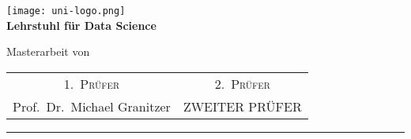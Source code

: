 \begin{titlepage}
    \centering
    \begin{onehalfspace}
    	
        	\texttt{[image: uni-logo.png]}\\
        	\vspace{1.0cm}
        	\large {\bfseries Lehrstuhl f\"ur Data Science }\\

        	\vspace{2.5cm}

            \begin{doublespace}
            	{\textsf{\Huge{\thetitle}}}
            \end{doublespace}

        	\vspace{2cm}

            \Large{Masterarbeit von}\\

        	\vspace{1cm}

        	{\bfseries \large{\theauthor}}

        	\vfill

        	{\large
        		\begin{tabular}[l]{cc}
        			\textsc{1.~Pr\"ufer} & \textsc{2.~Pr\"ufer} \\
        			Prof.~Dr.~Michael Granitzer& ZWEITER PR\"UFER
        		\end{tabular}
        	}

        	\vspace{1.5cm}

        	\parbox{\linewidth}{\hrule\strut}

            \vfill

	    \thedate
    \end{onehalfspace}
\end{titlepage}

